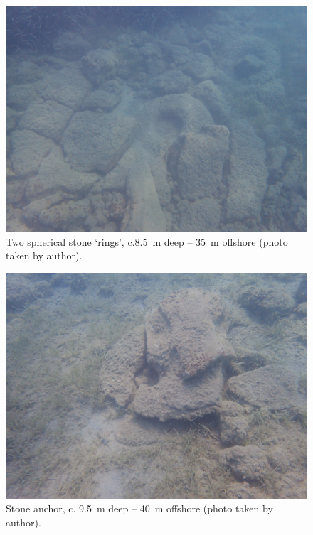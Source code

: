 \begin{figure}
	\includegraphics[width=\linewidth]{figures/takkou_dobroski_Fig3.jpg}
	\centering
	\caption{Two spherical stone ‘rings’, c.\SI{8.5}{\metre} deep – \SI{35}{\metre} offshore (photo taken by author).}
	\label{fig:Takkou_Fig3}
\end{figure}
	
\begin{figure}
	\includegraphics[width=\linewidth]{figures/takkou_dobroski_Fig4.jpg}
	\centering
	\caption{Stone anchor, c. \SI{9.5}{\metre} deep – \SI{40}{\metre} offshore (photo taken by author).}
	\label{fig:Takkou_Fig4}
\end{figure}		

